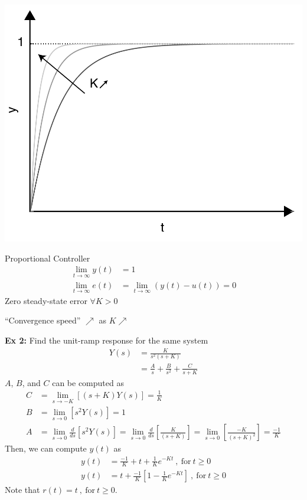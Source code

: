 \documentclass[twoside]{article}
\begin{document}
         \begin{minipage}[h]{0.5\linewidth}
    \begin{center}
      \includegraphics[width=1\textwidth]{step}
    \end{center}
  \end{minipage}
    \begin{minipage}[h]{0.5\linewidth}
        \begin{center}
          Proportional Controller
      \begin{align*}
	\lim_{t \to \infty} y(t) &= 1
	\\
	\lim_{t \to \infty} e(t) &= \lim_{t \to \infty} (y(t) - u(t)) = 0
      \end{align*}
      Zero steady-state error $\forall K > 0$
      
      ``Convergence speed'' $ \nearrow$ as $K \nearrow$
          \end{center}
  \end{minipage}

\textbf{Ex 2:} Find the unit-ramp response for the same system
%
\begin{align*}
	Y(s) &= \frac{K}{s^2 (s+K)} 
	\\
	&= \frac{A}{s} + \frac{B}{s^2} + \frac{C}{s+K}
\end{align*}
%
$A$, $B$, and $C$ can be computed as
%
\begin{align*}
	C &= \lim_{s \to -K} \left[  (s+K) Y(s) \right] = \frac{1}{K} 
	\\ 
	B &= \lim_{s \to 0} \left[  s^2 Y(s) \right] = 1
	\\
	A &= \lim_{s \to 0} \frac{d}{d s} \left[  s^2 Y(s) \right] =
	 \lim_{s \to 0} \frac{d}{d s} \left[  \frac{K}{(s+K)}  \right] 
	=  \lim_{s \to 0} \left[  \frac{-K}{(s+K)^2}  \right] 
	= \frac{-1}{K}
\end{align*}
%
Then, we can compute $y(t)$ as
%
  \begin{align*}
y(t) &= \frac{-1}{K} + t + \frac{1}{K} e^{-K t} \ ,  \ \mathrm{for} \ t \geq 0
\\
y(t) &= t + \frac{-1}{K} \left[ 1 -  \frac{1}{K} e^{-K t} \right] \ ,  \ \mathrm{for} \ t \geq 0
\end{align*}
%
Note that $r(t) = t \ , \ \mathrm{for} \ t \geq 0$.
\end{document}

